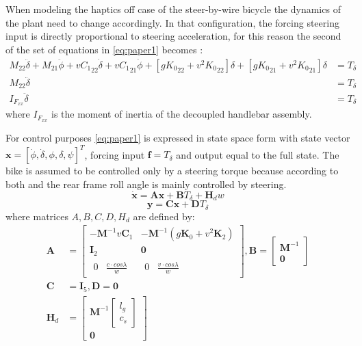 When modeling the haptics off case of the steer-by-wire bicycle the dynamics of the plant need to change accordingly. In that configuration, the forcing steering input is directly proportional to steering acceleration, for this reason the second of the set of equations in \ref{eq:paper1} becomes :
\begin{align}
    M_{22}\ddot{\delta}+ M_{21}\ddot{\phi} + v{C_1}_{22}\dot{\delta} + v{C_1}_{21}\dot{\phi}+[g{K_0}_{22}+v^2{K_0}_{22}]\delta +[g{K_0}_{21}+v^2{K_0}_{21}]\delta &= T_{\delta} \\
    M_{22}\ddot{\delta} &= T_{\delta} \\
    I_{F_{xx}}\ddot{\delta} &= T_{\delta} 
\end{align}
where \ensuremath{I_{F_{xx}}} is the moment of inertia of the  decoupled handlebar assembly.
 
For control purposes \cref{eq:paper1} is expressed in state space form with state vector \ensuremath{\mathbf{x}=[\dot{\phi}, \dot{\delta}, \phi, \delta, \psi]^{T}}, forcing input \ensuremath{\mathbf{f}=T_{\delta}} and output equal to the full state. The  bike is assumed to be controlled only by a steering torque because according to both \citet{moore2012human} and \citet{weir1973manual}  the rear frame roll angle is mainly
 controlled by steering. 
 \begin{equation}
    \dot{\mathbf{x}}=\mathbf{A} \mathbf{x}+\mathbf{B} T_\delta + \mathbf{H}_d w
    \label{eq:bikeEOM}
\end{equation}
\begin{equation}
    \mathbf{y}=\mathbf{C} \mathbf{x}+\mathbf{D} T_\delta
\end{equation}
where matrices \ensuremath{A,B,C,D,H_d} are defined by:
\begin{align}
    \mathbf{A} &=\begin{bmatrix}
        -\mathbf{M}^{-1}v\mathbf{C}_{1} & -\mathbf{M}^{-1}(g \mathbf{K}_{0}+v^{2}\mathbf{K}_{2}) \\
        {\mathbf{I}_2}                    & {\mathbf{0}} \\  {\begin{matrix} {0} & { \frac{c\cdot cos\lambda}{w}}\end{matrix}} &  {\begin{matrix} 0 & { \frac{v \cdot cos\lambda}{w}}\end{matrix} } 
    \end{bmatrix} , \mathbf{B}=\left[ \begin{array}{c}{\mathbf{M}^{-1}} \\ {\mathbf{0}}\end{array}\right] \\
    \mathbf{C} &= {\mathbf{I}_5} , \mathbf{D}=\mathbf{0} \\
    \mathbf{H}_d &= \left[ \begin{array}{c}{\mathbf{M}^{-1}}{\begin{bmatrix} l_g \\ c_s\end{bmatrix} }  \\ {\mathbf{0}}\end{array}\right] 
\end{align}

